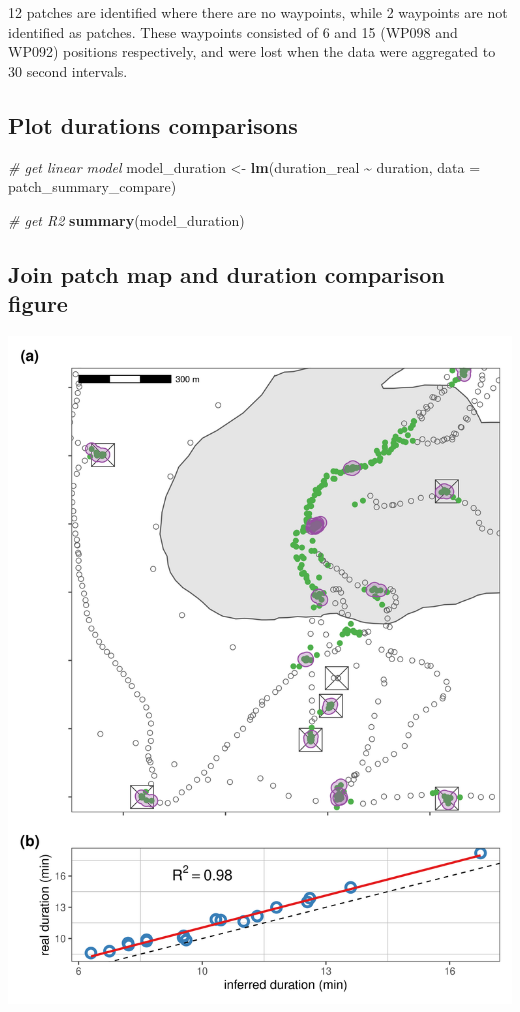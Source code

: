 \documentclass[
]{scrreprt}
\newenvironment{Shaded}{}{}
\newcommand{\CommentTok}[1]{\textcolor[rgb]{0.38,0.63,0.69}{\textit{#1}}}
\newcommand{\DataTypeTok}[1]{\textcolor[rgb]{0.56,0.13,0.00}{#1}}
\newcommand{\KeywordTok}[1]{\textcolor[rgb]{0.00,0.44,0.13}{\textbf{#1}}}
\newcommand{\NormalTok}[1]{#1}
\newcommand{\OperatorTok}[1]{\textcolor[rgb]{0.40,0.40,0.40}{#1}}
\newcommand{\StringTok}[1]{\textcolor[rgb]{0.25,0.44,0.63}{#1}}
\begin{document}
12 patches are identified where there are no waypoints, while 2 waypoints are not identified as patches. These waypoints consisted of 6 and 15 (WP098 and WP092) positions respectively, and were lost when the data were aggregated to 30 second intervals.

\hypertarget{plot-durations-comparisons}{%
\subsection{Plot durations comparisons}\label{plot-durations-comparisons}}

\begin{Shaded}
\begin{Highlighting}[]
\CommentTok{\# get linear model}
\NormalTok{model\_duration <{-}}\StringTok{ }\KeywordTok{lm}\NormalTok{(duration\_real }\OperatorTok{\textasciitilde{}}\StringTok{ }\NormalTok{duration,}
                     \DataTypeTok{data =}\NormalTok{ patch\_summary\_compare)}

\CommentTok{\# get R2}
\KeywordTok{summary}\NormalTok{(model\_duration)}
\end{Highlighting}
\end{Shaded}

\hypertarget{join-patch-map-and-duration-comparison-figure}{%
\subsection{Join patch map and duration comparison figure}\label{join-patch-map-and-duration-comparison-figure}}

\includegraphics{figures/fig_calib_residence_patch.png}
\end{document}
